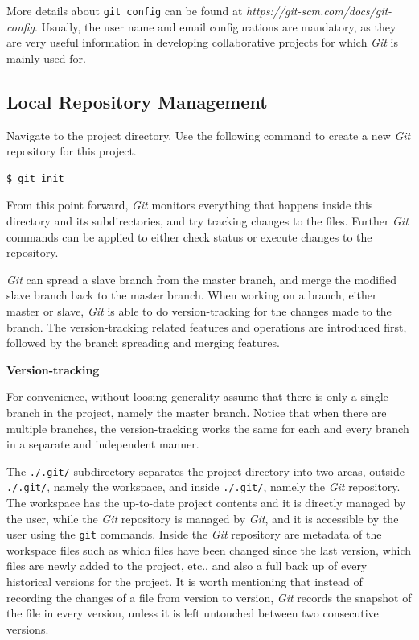 More details about \verb|git config| can be found at \textit{https://git-scm.com/docs/git-config}. Usually, the user name and email configurations are mandatory, as they are very useful information in developing collaborative projects for which \textit{Git} is mainly used for.

\subsection{Local Repository Management}

Navigate to the project directory. Use the following command to create a new \textit{Git} repository for this project.
\begin{lstlisting}
$ git init
\end{lstlisting}
From this point forward, \textit{Git} monitors everything that happens inside this directory and its subdirectories, and try tracking changes to the files. Further \textit{Git} commands can be applied to either check status or execute changes to the repository.

\textit{Git} can spread a slave branch from the master branch, and merge the modified slave branch back to the master branch. When working on a branch, either master or slave, \textit{Git} is able to do version-tracking for the changes made to the branch. The version-tracking related features and operations are introduced first, followed by the branch spreading and merging features.

\vspace{10pt}

\noindent \textbf{Version-tracking}

\vspace{10pt}

For convenience, without loosing generality assume that there is only a single branch in the project, namely the master branch. Notice that when there are multiple branches, the version-tracking works the same for each and every branch in a separate and independent manner.

The \verb|./.git/| subdirectory separates the project directory into two areas, outside \verb|./.git/|, namely the workspace, and inside \verb|./.git/|, namely the \textit{Git} repository. The workspace has the up-to-date project contents and it is directly managed by the user, while the \textit{Git} repository is managed by \textit{Git}, and it is accessible by the user using the \verb|git| commands. Inside the \textit{Git} repository are metadata of the workspace files such as which files have been changed since the last version, which files are newly added to the project, etc., and also a full back up of every historical versions for the project. It is worth mentioning that instead of recording the changes of a file from version to version, \textit{Git} records the snapshot of the file in every version, unless it is left untouched between two consecutive versions.

